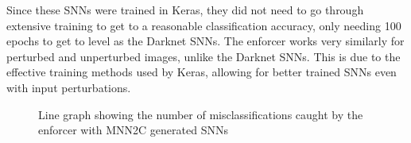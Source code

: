 Since these \acp{SNN} were trained in Keras, they did not need to go through extensive training to get to a reasonable classification accuracy, only needing 100 epochs to get to level as the Darknet \acp{SNN}.
The enforcer works very similarly for perturbed and unperturbed images, unlike the Darknet \acp{SNN}.
This is due to the effective training methods used by Keras, allowing for better trained \acp{SNN} even with input perturbations.


\begin{figure}[t]
	\centering
	\scalebox{0.9}{}
	\caption{Line graph showing the number of misclassifications caught by the enforcer with \ac{MNN2C} generated \acp{SNN} \label{fig:sign-graphboth-mnn2c}}
\end{figure}





















